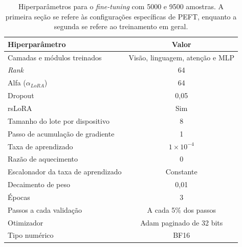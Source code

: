 \begin{table}[ht]
    \caption{\small Hiperparâmetros para o \textit{fine-tuning} com 5000 e 9500 amostras. A primeira seção se refere às
    configurações
    específicas de \ac{PEFT}, enquanto
    a segunda se refere ao treinamento em geral.}
    \centering
    \begin{tabular}{l|c}
        \hline
        Hiperparâmetro                             & Valor                                  \\ \hline
        Camadas e módulos treinados                & Visão, linguagem, atenção e \ac{MLP}   \\
        \textit{Rank}                              & 64                                     \\
        Alfa (\begin{math}\alpha_{LoRA}\end{math}) & 64                                     \\
        Dropout                                    & 0,05                                   \\
        \ac{rsLoRA}                                & Sim                                    \\ \hline
        Tamanho do lote por dispositivo            & 8                                      \\
        Passo de acumulação de gradiente           & 1                                      \\
        Taxa de aprendizado                        & \begin{math}1 \times 10^{-4}\end{math} \\
        Razão de aquecimento                       & 0                                      \\
        Escalonador da taxa de aprendizado         & Constante                              \\
        Decaimento de peso                         & 0,01                                   \\
        Épocas                                     & 3                                      \\
        Passos a cada validação                    & A cada 5\% dos passos                  \\
        Otimizador                                 & \ac{Adam} paginado de 32 bits          \\
        Tipo numérico                              & \ac{BF16}                              \\ \hline
    \end{tabular}
    \label{tab:qlora_5000_config}
\end{table}

